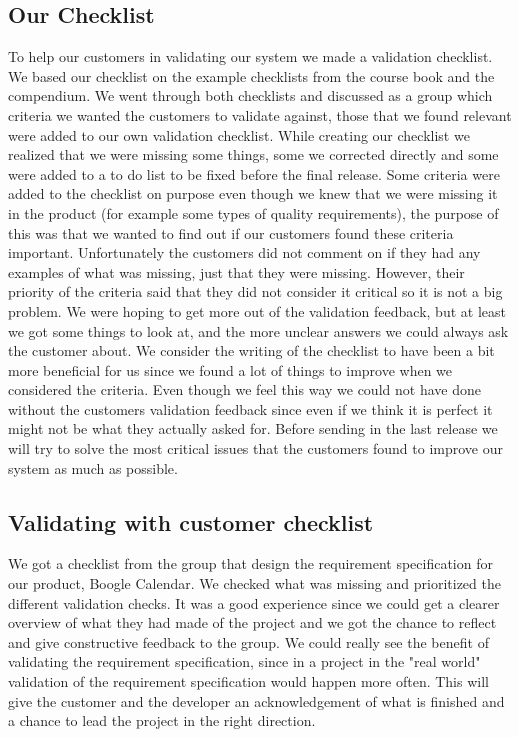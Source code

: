 \documentclass[a4paper]{article}
\begin{document}
			
			\subsection{Our Checklist}
				To help our customers in validating our system we made a validation checklist. We based our checklist on the example checklists from the course book and the compendium. We went through both checklists and discussed as a group which criteria we wanted the customers to validate against, those that we found relevant were added to our own validation checklist. While creating our checklist we realized that we were missing some things, some we corrected directly and some were added to a to do list to be fixed before the final release. Some criteria were added to the checklist on purpose even though we knew that we were missing it in the product (for example some types of quality requirements), the purpose of this was that we wanted to find out if our customers found these criteria important. Unfortunately the customers did not comment on if they had any examples of what was missing, just that they were missing. However, their priority of the criteria said that they did not consider it critical so it is not a big problem. We were hoping to get more out of the validation feedback, but at least we got some things to look at, and the more unclear answers we could always ask the customer about. We consider the writing of the checklist to have been a bit more beneficial for us since we found a lot of things to improve when we considered the criteria. Even though we feel this way we could not have done without the customers validation feedback since even if we think it is perfect it might not be what they actually asked for.
				Before sending in the last release we will try to solve the most critical issues that the customers found to improve our system as much as possible.
				 			
			\subsection{Validating with customer checklist}
				We got a checklist from the group that design the requirement specification for our product, Boogle Calendar. We checked what was missing and prioritized the different validation checks. It was a good experience since we could get a clearer overview of what they had made of the project and we got the chance to reflect and give constructive feedback to the group. We could really see the benefit of validating the requirement specification, since in a project in the "real world" validation of the requirement specification would happen more often. This will give the customer and the developer an acknowledgement of what is finished and a chance to lead the project in the right direction.
\end{document}
